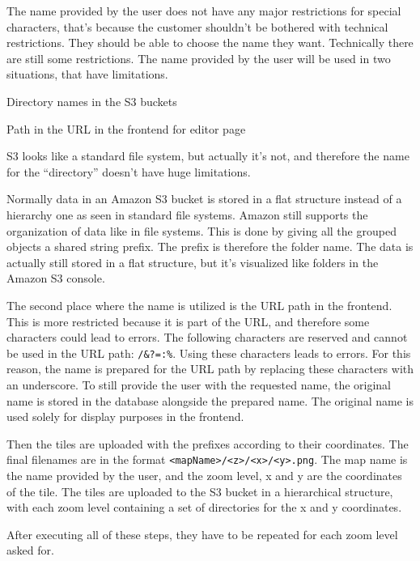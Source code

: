 The name provided by the user does not have any major restrictions for special characters, that's because the customer shouldn't be bothered with technical restrictions. They should be able to choose the name they want. Technically there are still some restrictions. The name provided by the user will be used in two situations, that have limitations. 
\begin{compactenum}
    \item Directory names in the S3 buckets
    \item Path in the URL in the frontend for editor page
\end{compactenum}

S3 looks like a standard file system, but actually it's not, and therefore the name for the ``directory'' doesn't have huge limitations. 

Normally data in an Amazon S3 bucket is stored in a flat structure instead of a hierarchy one as seen in standard file systems. Amazon still supports the organization of data like in file systems. This is done by giving all the grouped objects a shared string prefix. The prefix is therefore the folder name. The data is actually still stored in a flat structure, but it's visualized like folders in the Amazon S3 console. \cite{AWSUsingFolders}

The second place where the name is utilized is the URL path in the frontend. This is more restricted because it is part of the URL, and therefore some characters could lead to errors. The following characters are reserved and cannot be used in the URL path: \texttt{/\&?=:\%}. Using these characters leads to errors. For this reason, the name is prepared for the URL path by replacing these characters with an underscore. To still provide the user with the requested name, the original name is stored in the database alongside the prepared name. The original name is used solely for display purposes in the frontend.

Then the tiles are uploaded with the prefixes according to their coordinates. The final filenames are in the format \texttt{<mapName>/<z>/<x>/<y>.png}. The map name is the name provided by the user, and the zoom level, x and y are the coordinates of the tile. The tiles are uploaded to the S3 bucket in a hierarchical structure, with each zoom level containing a set of directories for the x and y coordinates.

After executing all of these steps, they have to be repeated for each zoom level asked for. 

